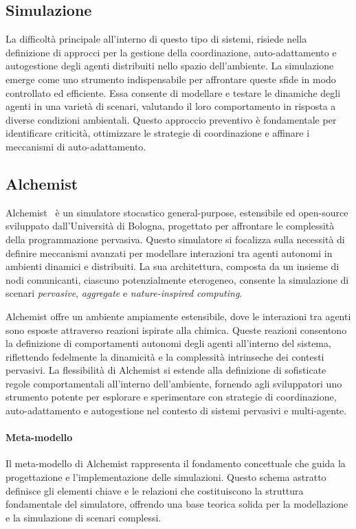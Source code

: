 \subsection{Simulazione}\label{ssec:simulation}
La difficoltà principale all'interno di questo tipo di sistemi, risiede nella definizione di approcci per la gestione della coordinazione, auto-adattamento
e autogestione degli agenti distribuiti nello spazio dell'ambiente. 
La simulazione emerge come uno strumento indispensabile per affrontare queste sfide in modo controllato ed efficiente. Essa consente di modellare e testare
le dinamiche degli agenti in una varietà di scenari, valutando il loro comportamento in risposta a diverse condizioni ambientali. Questo approccio
preventivo è fondamentale per identificare criticità, ottimizzare le strategie di coordinazione e affinare i meccanismi di auto-adattamento.

\subsection{Alchemist}\label{ssec:alchemist}
Alchemist~\cite{alchemist} è un simulatore stocastico general-purpose, estensibile ed open-source sviluppato dall'Università di Bologna, progettato
per affrontare le complessità della programmazione pervasiva. Questo simulatore si focalizza sulla necessità di definire meccanismi avanzati per modellare
interazioni tra agenti autonomi in ambienti dinamici e distribuiti. La sua architettura, composta da un insieme di nodi comunicanti, ciascuno
potenzialmente eterogeneo, consente la simulazione di scenari \textit{pervasive}, \textit{aggregate} e \textit{nature-inspired computing}.

Alchemist offre un ambiente ampiamente estensibile, dove le interazioni tra agenti sono esposte attraverso reazioni ispirate alla chimica. Queste reazioni
consentono la definizione di comportamenti autonomi degli agenti all'interno del sistema, riflettendo fedelmente la dinamicità e la complessità intrinseche
dei contesti pervasivi. La flessibilità di Alchemist si estende alla definizione di sofisticate regole comportamentali all'interno dell'ambiente,
fornendo agli sviluppatori uno strumento potente per esplorare e sperimentare con strategie di coordinazione, auto-adattamento e autogestione nel contesto di
sistemi pervasivi e multi-agente.

\paragraph{Meta-modello} Il meta-modello di Alchemist rappresenta il fondamento concettuale che guida la progettazione e l'implementazione delle simulazioni. Questo
schema astratto definisce gli elementi chiave e le relazioni che costituiscono la struttura fondamentale del simulatore, offrendo una base teorica solida per
la modellazione e la simulazione di scenari complessi.

